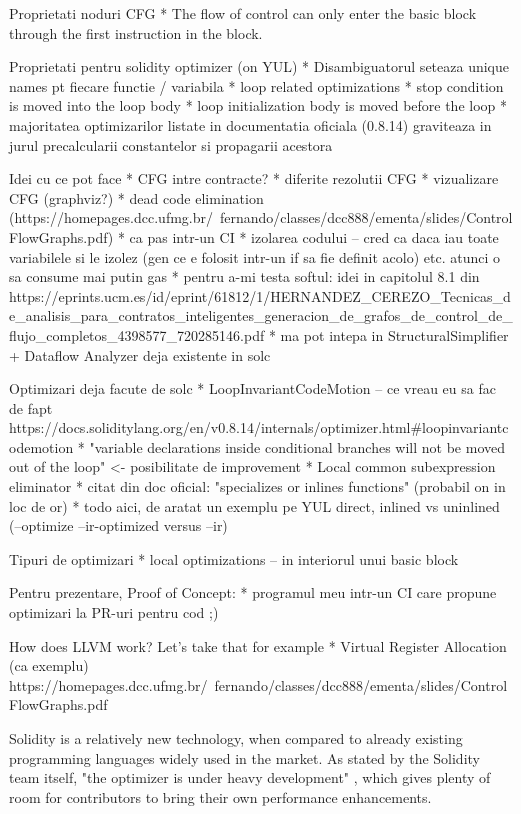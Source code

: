 Proprietati noduri CFG
* The	flow	of	control	can	only	
enter	the	basic	block	through	
the	first	instruction	in	the	
block.

Proprietati pentru solidity optimizer (on YUL)
* Disambiguatorul seteaza unique names pt fiecare functie / variabila
* loop related optimizations
  * stop condition is moved into the loop body
  * loop initialization body is moved before the loop
  * majoritatea optimizarilor listate in documentatia oficiala (0.8.14) graviteaza in jurul precalcularii constantelor si propagarii acestora



Idei cu ce pot face
* CFG intre contracte?
* diferite rezolutii CFG
* vizualizare CFG (graphviz?)
* dead code elimination (https://homepages.dcc.ufmg.br/~fernando/classes/dcc888/ementa/slides/ControlFlowGraphs.pdf)
  * ca pas intr-un CI
* izolarea codului – cred ca daca iau toate variabilele si le izolez (gen ce e folosit intr-un if sa fie definit acolo) etc. atunci o sa consume mai putin gas
* pentru a-mi testa softul: idei in capitolul 8.1 din https://eprints.ucm.es/id/eprint/61812/1/HERNANDEZ_CEREZO_Tecnicas_de_analisis_para_contratos_inteligentes_generacion_de_grafos_de_control_de_flujo_completos_4398577_720285146.pdf
* ma pot intepa in StructuralSimplifier + Dataflow Analyzer deja existente in solc

Optimizari deja facute de solc
* LoopInvariantCodeMotion – ce vreau eu sa fac de fapt https://docs.soliditylang.org/en/v0.8.14/internals/optimizer.html#loopinvariantcodemotion
  * "variable declarations inside conditional branches will not be moved out of the loop" <- posibilitate de improvement
* Local common subexpression eliminator
* citat din doc oficial: "specializes or inlines functions" (probabil on in loc de or)
  * todo aici, de aratat un exemplu pe YUL direct, inlined vs uninlined (--optimize --ir-optimized versus --ir)


Tipuri de optimizari
* local optimizations – in interiorul unui basic block

Pentru prezentare, Proof of Concept:
* programul meu intr-un CI care propune optimizari la PR-uri pentru cod ;)


How does LLVM work? Let's take that for example
* Virtual Register Allocation (ca exemplu)
https://homepages.dcc.ufmg.br/~fernando/classes/dcc888/ementa/slides/ControlFlowGraphs.pdf





Solidity is a relatively new technology, when compared to already existing programming languages widely used in the market. As stated by the Solidity team itself, "the optimizer is under heavy development" \cite{solidity-optimizer}, which gives plenty of room for contributors to bring their own performance enhancements.

